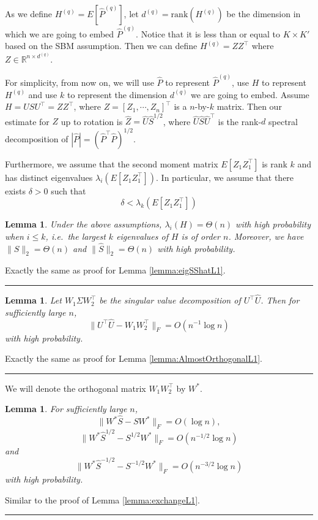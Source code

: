 \documentclass[a4paper]{article}
\newenvironment{proof}{{\bf Proof:  }}{\hfill\rule{2mm}{2mm}}
\newtheorem{lemma}[fact]{Lemma}
\renewcommand{\hat}{\widehat}
\begin{document}
As we define $H^{(q)} = E[\hat{P}^{(q)}]$, let $d^{(q)} = \mathrm{rank}(H^{(q)})$ be the dimension in which we are going to embed $\hat{P}^{(q)}$. Notice that it is less than or equal to $K\times K'$ based on the SBM assumption. Then we can define $H^{(q)} = Z Z^{\top}$ where $Z \in \mathbb{R}^{n \times d^{(q)}}$.

For simplicity, from now on, we will use $\hat{P}$ to represent $\hat{P}^{(q)}$, use $H$ to represent $H^{(q)}$ and use $k$ to represent the dimension $d^{(q)}$ we are going to embed. Assume $H = U S U^{\top} = Z Z^{\top}$, where $Z = [Z_1, \cdots, Z_n]^{\top}$ is a $n$-by-$k$ matrix. Then our estimate for $Z$ up to rotation is $\hat{Z} = \hat{U} \hat{S}^{1/2}$, where $\hat{U} \hat{S} \hat{U}^{\top}$ is the rank-$d$ spectral decomposition of $|\hat{P}| = (\hat{P}^{\top} \hat{P})^{1/2}$.

Furthermore, we assume that the second moment matrix $E[Z_1 Z_1^{\top}]$ is rank $k$ and has distinct eigenvalues $\lambda_i(E[Z_1 Z_1^{\top}])$. In particular, we assume that there exists $\delta > 0$ such that
\[
	\delta < \lambda_k(E[Z_1 Z_1^{\top}])
\]

\begin{lemma}
\label{lemma:eigSShat}
Under the above assumptions, $\lambda_i(H) = \Theta(n)$ with high probability when $i \le k$, i.e.\ the largest $k$ eigenvalues of $H$ is of order $n$. Moreover, we have $\| S \|_2 = \Theta(n)$ and $\| \hat{S} \|_2 = \Theta(n)$ with high probability.
\end{lemma}
\begin{proof}
Exactly the same as proof for Lemma \ref{lemma:eigSShatL1}.
\end{proof}

\begin{lemma}
\label{lemma:AlmostOrthogonal}
Let $W_1 \Sigma W_2^{\top}$ be the singular value decomposition of $U^{\top} \hat{U}$. Then for sufficiently large $n$, 
\[
	\| U^{\top} \hat{U} - W_1 W_2^{\top} \|_F = O(n^{-1} \log n)
\]
with high probability.
\end{lemma}
\begin{proof}
Exactly the same as proof for Lemma \ref{lemma:AlmostOrthogonalL1}.
\end{proof}

We will denote the orthogonal matrix $W_1 W_2^{\top}$ by $W^*$.
\begin{lemma}
\label{lemma:exchange}
For sufficiently large $n$,
\[
	\| W^* \hat{S} - S W^* \|_F = O(\log n),
\]
\[
	\|W^* \hat{S}^{1/2} - S^{1/2} W^* \|_F = O(n^{-1/2} \log n)
\]
and
\[
	\| W^* \hat{S}^{-1/2} - S^{-1/2} W^* \|_F = O(n^{-3/2} \log n)
\]
with high probability.
\end{lemma}
\begin{proof}
Similar to the proof of Lemma \ref{lemma:exchangeL1}.
\end{proof}
\end{document}
